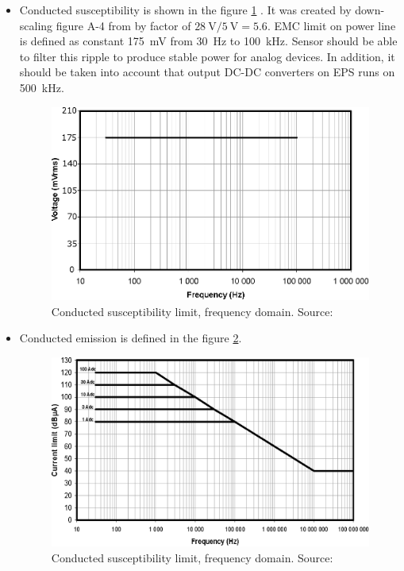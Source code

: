         \begin{itemize}
            \item Conducted susceptibility is shown in the figure \ref{EMC_conducted_susceptibility} . It was created by down-scaling figure A-4 from \cite{ECSS_E_ST_20_07C} by factor of $\SI{28}{\volt}/\SI{5}{\volt} = 5.6$. EMC limit on power line is defined as constant \SI{175}{\milli\volt} from \SI{30}{\hertz} to \SI{100}{\kilo\hertz}. Sensor should be able to filter this ripple to produce stable power for analog devices. In addition, it should be taken into account that output DC-DC converters on EPS runs on \SI{500}{\kilo\hertz}.

            \begin{figure}[H]
                \centering
                \includegraphics[width=0.5\paperwidth]{img/04/EMC_conducted_susceptibility.eps}
                \caption{Conducted susceptibility limit, frequency domain. Source: \cite{ECSS_E_ST_20_07C}}
                \label{EMC_conducted_susceptibility}
            \end{figure}


            \item Conducted emission is defined in the figure \ref{EMC_conducted_emission}.

            \begin{figure}[H]
                \centering
                \includegraphics[width=0.5\paperwidth]{img/04/EMC_conducted_emission.eps}
                \caption{Conducted susceptibility limit, frequency domain. Source: \cite{ECSS_E_ST_20_07C}}
                \label{EMC_conducted_emission}
            \end{figure}



\end{itemize}
